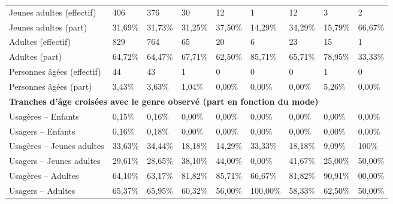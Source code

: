 \begin{longtable}{p{3.7cm}p{0.9cm}p{0.9cm}p{0.9cm}p{0.9cm}p{0.9cm}p{0.9cm}p{0.9cm}p{0.9cm}}
    \small{Jeunes adultes (effectif)} & \small{406} & \small{376} & \small{30} & \small{12} & \small{1} & \small{12} & \small{3} & \small{2}\\
    \small{Jeunes adultes (part)} & \small{31,69\%} & \small{31,73\%} & \small{31,25\%} & \small{37,50\%} & \small{14,29\%} & \small{34,29\%} & \small{15,79\%} & \small{66,67\%}\\
    \small{Adultes (effectif)} & \small{829} & \small{764} & \small{65} & \small{20} & \small{6} & \small{23} & \small{15} & \small{1}\\
    \small{Adultes (part)} & \small{64,72\%} & \small{64,47\%} & \small{67,71\%} & \small{62,50\%} & \small{85,71\%} & \small{65,71\%} & \small{78,95\%} & \small{33,33\%}\\
    \small{Personnes âgées (effectif)} & \small{44} & \small{43} & \small{1} & \small{0} & \small{0} & \small{0} & \small{1} & \small{0}\\  
    \small{Personnes âgées (part)} & \small{3,43\%} & \small{3,63\%} & \small{1,04\%} & \small{0,00\%} & \small{0,00\%} & \small{0,00\%} & \small{5,26\%} & \small{0,00\%}\\
        \hline
\multicolumn{9}{l}{\textbf{Tranches d'âge croisées avec le genre observé (part en fonction du mode)}}\\
    \small{Usagères – Enfants} & \small{0,15\%} & \small{0,16\%} & \small{0,00\%} & \small{0,00\%} & \small{0,00\%} & \small{0,00\%} & \small{0,00\%} & \small{0,00\%}\\
    \small{Usagers – Enfants} & \small{0,16\%} & \small{0,18\%} & \small{0,00\%} & \small{0,00\%} & \small{0,00\%} & \small{0,00\%} & \small{0,00\%} & \small{0,00\%}\\
    \small{Usagères – Jeunes adultes} & \small{33,63\%} & \small{34,44\%} & \small{18,18\%} & \small{14,29\%} & \small{33,33\%} & \small{18,18\%} & \small{9,09\%} & \small{100\%}\\
    \small{Usagers – Jeunes adultes} & \small{29,61\%} & \small{28,65\%} & \small{38,10\%} & \small{44,00\%} & \small{0,00\%} & \small{41,67\%} & \small{25,00\%} & \small{50,00\%}\\
    \small{Usagères – Adultes} & \small{64,10\%} & \small{63,17\%} & \small{81,82\%} & \small{85,71\%} & \small{66,67\%} & \small{81,82\%} & \small{90,91\%} & \small{00,00\%}\\
    \small{Usagers – Adultes} & \small{65,37\%} & \small{65,95\%} & \small{60,32\%} & \small{56,00\%} & \small{100,00\%} & \small{58,33\%} & \small{62,50\%} & \small{50,00\%}\\

\end{longtable}
